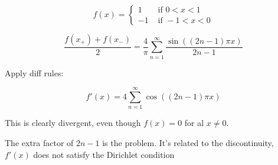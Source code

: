 \documentclass[a4paper]{article}
\begin{document}
\[ f(x) = \begin{cases} 1  & \text{ if } 0 < x < 1 \\ - 1 & \text{ if } -1 < x < 0 \end{cases} \]

\[ \frac{f(x_{+}) + f(x_{-})}{2}  = \frac{4}{\pi} \sum_{n=1}^{\infty} \frac{\sin\left(  (2n - 1)\pi x \right) }{2n - 1} \]

Apply diff rules:

\[ f'(x) = 4 \sum_{n=1}^{\infty} \cos \left( (2n - 1)\pi x \right)  \]

This is clearly divergent, even though $ f(x) = 0 $ for al $ x \neq 0 $.

 The extra factor of $ 2n - 1 $ is the problem. It's related to the discontinuity, $ f'(x) $ does not satisfy the Dirichlet condition


  
\end{document}
